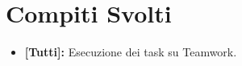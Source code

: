 \documentclass[../verbale-2017-02-21.tex]{subfiles}
\begin{document}
	\section{Compiti Svolti}
	\begin{itemize}
		\item \textbf{[Tutti]:} Esecuzione dei task su Teamwork.
	\end{itemize}
\end{document}
